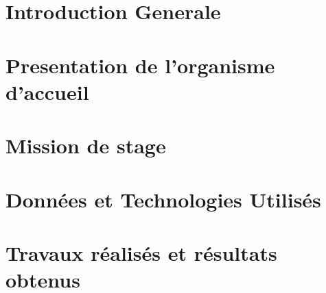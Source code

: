 \newpage
\section{Introduction Generale} 
 
\section{Presentation de l'organisme  d'accueil}

\newpage
\section{Mission de stage}

\section{Données et Technologies Utilisés} 

\section{Travaux réalisés et résultats obtenus} 

